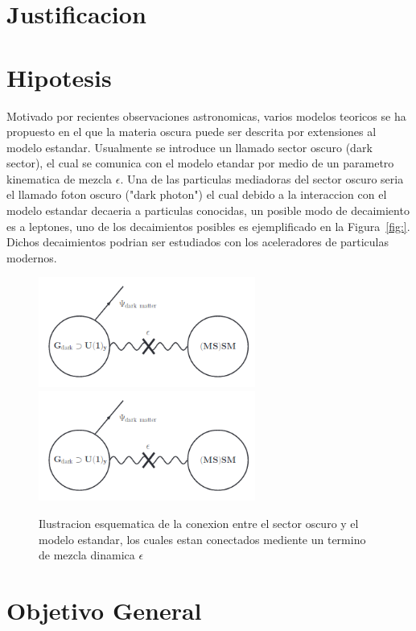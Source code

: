 \chapter{Justificacion}



\chapter{Hipotesis}
Motivado por recientes observaciones astronomicas, varios modelos teoricos se ha propuesto en el que la materia oscura puede ser descrita por extensiones al modelo estandar. Usualmente se introduce un llamado sector oscuro (dark sector), el cual se comunica con el modelo etandar por medio de un parametro kinematica de mezcla $\epsilon$. Una de las particulas mediadoras del sector oscuro seria el llamado foton oscuro ("dark photon") el cual debido a la interaccion con el modelo estandar decaeria a particulas conocidas, un posible modo de decaimiento es a leptones, uno de los decaimientos posibles es ejemplificado en la Figura~\ref{fig:}.  Dichos decaimientos podrian ser estudiados con los aceleradores de particulas modernos. 


\begin{figure}
\begin{center}
  \includegraphics[width=2.8in]{sketch_darksector.png}
  \includegraphics[width=2.8in]{sketch_darksector.png}
  \caption{Ilustracion esquematica de la conexion entre el sector oscuro y el modelo estandar, los cuales estan conectados mediente un termino de mezcla dinamica $\epsilon$}
  \label{fig:AMS_positron}
\end{center}
\end{figure}


\chapter{Objetivo General}
